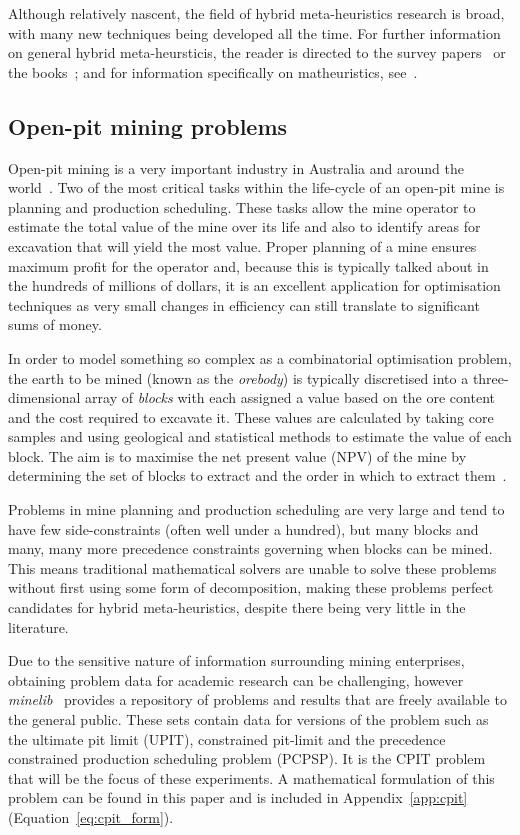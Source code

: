 \documentclass[journal]{IEEEtran}
\begin{document}
Although relatively nascent, the field of hybrid meta-heuristics research is broad, with many new techniques being developed all the time. For further information on general hybrid meta-heursticis, the reader is directed to the survey papers~\cite{talbi,hybridmeta,hybrid-decomp} or the books~\cite{hybrid-book1,hybrid-book2}; and for information specifically on matheuristics, see~\cite{matheuristics,matheuristics-new1,matheuristics-new2}.

\subsection{Open-pit mining problems}
Open-pit mining is a very important industry in Australia and around the world~\cite{singh}. Two of the most critical tasks within the life-cycle of an open-pit mine is planning and production scheduling. These tasks allow the mine operator to estimate the total value of the mine over its life and also to identify areas for excavation that will yield the most value. Proper planning of a mine ensures maximum profit for the operator and, because this is typically talked about in the hundreds of millions of dollars, it is an excellent application for optimisation techniques as very small changes in efficiency can still translate to significant sums of money.

In order to model something so complex as a combinatorial optimisation problem, the earth to be mined (known as the \emph{orebody}) is typically discretised into a three-dimensional array of \emph{blocks} with each assigned a value based on the ore content and the cost required to excavate it. These values are calculated by taking core samples and using geological and statistical methods to estimate the value of each block. The aim is to maximise the net present value (NPV) of the mine by determining the set of blocks to extract and the order in which to extract them~\cite{meagher}.

Problems in mine planning and production scheduling are very large and tend to have few side-constraints (often well under a hundred), but many blocks and many, many more precedence constraints governing when blocks can be mined. This means traditional mathematical solvers are unable to solve these problems without first using some form of decomposition, making these problems perfect candidates for hybrid meta-heuristics, despite there being very little in the literature.

Due to the sensitive nature of information surrounding mining enterprises, obtaining problem data for academic research can be challenging, however \emph{minelib}~\cite{minelib} provides a repository of problems and results that are freely available to the general public. These sets contain data for versions of the problem such as the ultimate pit limit (UPIT), constrained pit-limit and the precedence constrained production scheduling problem (PCPSP). It is the CPIT problem that will be the focus of these experiments. A mathematical formulation of this problem can be found in this paper and is included in Appendix~\ref{app:cpit} (Equation~\ref{eq:cpit_form}).
\end{document}
